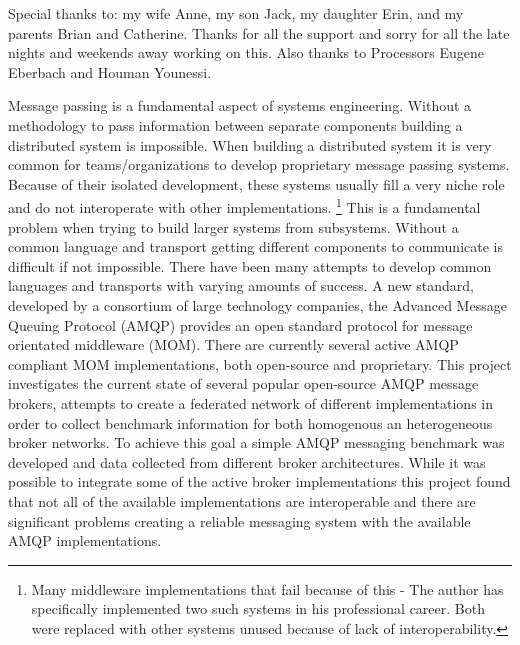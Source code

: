\documentclass{thesis}
\author{David Joe Wade}
\begin{document}
 
\listoftodos
\titlepage            	 %
\tableofcontents          %
\listoftables          	 %
\listoffigures         	 %

Special thanks to: my wife Anne, my son Jack, my daughter Erin, and my parents Brian and Catherine.  Thanks for all the support and sorry for all the late nights and weekends away working on this.  Also thanks to Processors Eugene Eberbach and Houman Younessi.

Message passing is a fundamental aspect of systems engineering.  Without a methodology to pass information between separate components building a distributed system is impossible.  When building a distributed system it is very common for teams/organizations to develop proprietary message passing systems.  Because of their isolated development, these systems usually fill a very niche role and do not interoperate with other implementations. \footnote{Many middleware implementations that fail because of this - The author has specifically implemented two such systems in his professional career.  Both were replaced with other systems unused because of lack of interoperability.} This is a fundamental problem when trying to build larger systems from subsystems.  Without a common language and transport getting different components to communicate is difficult if not impossible.  There have been many attempts to develop common languages and transports with varying amounts of success.  A new standard, developed by a consortium of large technology companies, the Advanced Message Queuing Protocol (AMQP) provides an open standard protocol for message orientated middleware (MOM).  There are currently several active AMQP compliant MOM implementations, both open-source and proprietary.  This project investigates the current state of several popular open-source AMQP message brokers, attempts to create a federated network of different implementations in order to collect benchmark information for both homogenous an heterogeneous broker networks.  To achieve this goal a simple AMQP messaging benchmark was developed and data collected from different broker architectures.  While it was possible to integrate some of the active broker implementations this project found that not all of the available implementations are interoperable and there are significant problems creating a reliable messaging system with the available AMQP implementations.  
\end{document}
